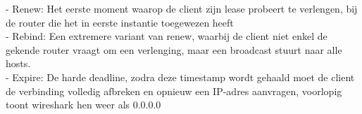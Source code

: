 - Renew: Het eerste moment waarop de client zijn lease probeert te verlengen, bij de router die het in eerste instantie toegewezen heeft\\
- Rebind: Een extremere variant van renew, waarbij de client niet enkel de gekende router vraagt om een verlenging, maar een broadcast stuurt naar alle hosts.\\
- Expire: De harde deadline, zodra deze timestamp wordt gehaald moet de client de verbinding volledig afbreken en opnieuw een IP-adres aanvragen, voorlopig toont wireshark hen weer als 0.0.0.0